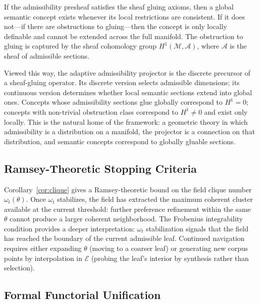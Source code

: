 \documentclass[12pt, a4paper]{article}
\theoremstyle{plain}
\theoremstyle{definition}
\begin{document}
If the admissibility presheaf satisfies the sheaf gluing axioms, then a
global semantic concept exists whenever its local restrictions are
consistent. If it does not---if there are obstructions to gluing---then
the concept is only locally definable and cannot be extended across the
full manifold. The obstruction to gluing is captured by the sheaf
cohomology group $H^1(\mathcal{M}, \mathcal{A})$, where $\mathcal{A}$ is
the sheaf of admissible sections.

Viewed this way, the adaptive admissibility projector is the discrete
precursor of a sheaf-gluing operator. Its discrete version selects
admissible dimensions; its continuous version determines whether local
semantic sections extend into global ones. Concepts whose admissibility
sections glue globally correspond to $H^1 = 0$; concepts with non-trivial
obstruction class correspond to $H^1 \neq 0$ and exist only locally. This
is the natural home of the framework: a geometric theory in which
admissibility is a distribution on a manifold, the projector is a
connection on that distribution, and semantic concepts correspond to
globally gluable sections.

\subsection{Ramsey-Theoretic Stopping Criteria}

Corollary~\ref{cor:clique} gives a Ramsey-theoretic bound on the field
clique number $\omega_t(\theta)$. Once $\omega_t$ stabilizes, the field
has extracted the maximum coherent cluster available at the current
threshold: further preference refinement within the same $\theta$ cannot
produce a larger coherent neighborhood. The Frobenius integrability
condition provides a deeper interpretation: $\omega_t$ stabilization
signals that the field has reached the boundary of the current admissible
leaf. Continued navigation requires either expanding $\theta$ (moving to
a coarser leaf) or generating new corpus points by interpolation in
$\mathcal{E}$ (probing the leaf's interior by synthesis rather than
selection).

\subsection{Formal Functorial Unification}
\end{document}
